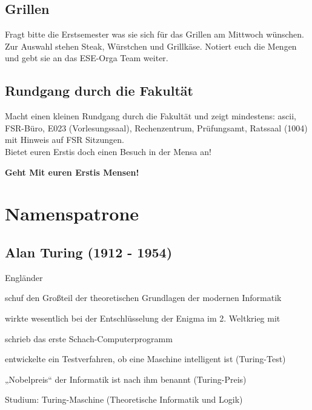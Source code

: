 \documentclass[a4paper,12pt]{report}
\begin{document}
\section{Grillen}

Fragt bitte die Erstsemester was sie sich für das Grillen am Mittwoch wünschen. Zur Auswahl stehen Steak, Würstchen und Grillkäse. Notiert euch die Mengen und gebt sie an das ESE-Orga Team weiter.

\section{Rundgang durch die Fakultät}
Macht einen kleinen Rundgang durch die Fakultät und zeigt mindestens: ascii, FSR-Büro, E023 (Vorlesungssaal), Rechenzentrum, Prüfungsamt, Ratssaal (1004) mit Hinweis auf FSR Sitzungen. \\
Bietet euren Erstis doch einen Besuch in der Mensa an!
\bigskip
\bigskip
\begin{center}
\huge{\textbf{Geht Mit euren Erstis Mensen!}}
\end{center}
\chapter{Namenspatrone}
\section*{Alan Turing (1912 - 1954)}
\begin{itemize*}
	\item Engländer
	\item schuf den Großteil der theoretischen Grundlagen der modernen Informatik
	\item wirkte wesentlich bei der Entschlüsselung der Enigma im 2. Weltkrieg mit
	\item schrieb das erste Schach-Computerprogramm
	\item entwickelte ein Testverfahren, ob eine Maschine intelligent ist (Turing-Test)
	\item „Nobelpreis“ der Informatik ist nach ihm benannt (Turing-Preis)
	\item Studium: Turing-Maschine (Theoretische Informatik und Logik)
\end{itemize*}
\end{document}
